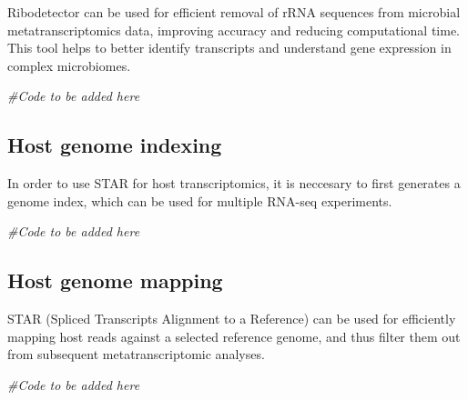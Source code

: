 \documentclass[
]{book}
\newenvironment{Shaded}{\begin{snugshade}}{\end{snugshade}}
\newcommand{\CommentTok}[1]{\textcolor[rgb]{0.56,0.35,0.01}{\textit{#1}}}
\begin{document}
Ribodetector can be used for efficient removal of rRNA sequences from microbial metatranscriptomics data, improving accuracy and reducing computational time. This tool helps to better identify transcripts and understand gene expression in complex microbiomes.

\small

\begin{Shaded}
\begin{Highlighting}[]
\CommentTok{\#Code to be added here}
\end{Highlighting}
\end{Shaded}

\normalsize

\hypertarget{host-genome-indexing}{%
\subsection*{Host genome indexing}\label{host-genome-indexing}}

In order to use STAR for host transcriptomics, it is neccesary to first generates a genome index, which can be used for multiple RNA-seq experiments.

\small

\begin{Shaded}
\begin{Highlighting}[]
\CommentTok{\#Code to be added here}
\end{Highlighting}
\end{Shaded}

\normalsize

\hypertarget{host-genome-mapping}{%
\subsection*{Host genome mapping}\label{host-genome-mapping}}

STAR (Spliced Transcripts Alignment to a Reference) can be used for efficiently mapping host reads against a selected reference genome, and thus filter them out from subsequent metatranscriptomic analyses.

\small

\begin{Shaded}
\begin{Highlighting}[]
\CommentTok{\#Code to be added here}
\end{Highlighting}
\end{Shaded}
\end{document}
